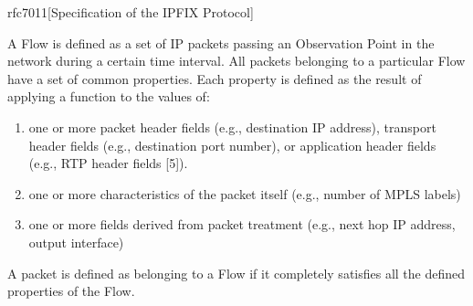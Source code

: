 \begin{displaycquote}{rfc7011}[Specification of the IPFIX Protocol]

    A Flow is defined as a set of IP packets passing an Observation
    Point in the network during a certain time interval.  All packets
    belonging to a particular Flow have a set of common properties.
    Each property is defined as the result of applying a function to
    the values of:

    \begin{enumerate}
    \item one or more packet header fields (e.g., destination IP
        address), transport header fields (e.g., destination port
        number), or application header fields (e.g., RTP header fields
        [5]).

    \item one or more characteristics of the packet itself (e.g., number
        of MPLS labels)

    \item one or more fields derived from packet treatment (e.g., next
        hop IP address, output interface)
	\end{enumerate}
        
    A packet is defined as belonging to a Flow if it completely
    satisfies all the defined properties of the Flow.

\end{displaycquote}

